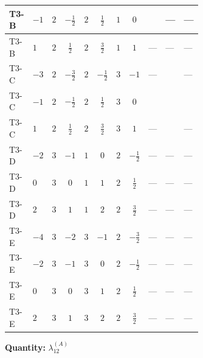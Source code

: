 \documentclass[8pt]{article}
\begin{document}
\begin{landscape}
\begin{longtable}{@{}llcccccc >{\raggedright\arraybackslash}p{0.21\linewidth} >{\raggedright\arraybackslash}p{0.21\linewidth} >{\raggedright\arraybackslash}p{0.21\linewidth}@{}}
\midrule
T3-B & $-1$ & $2$ & $-\frac{1}{2}$ & $2$ & $\frac{1}{2}$ & $1$ & $0$ & \scriptsize\adjustbox{max width=\linewidth}{$\begin{gathered} +{g_1}^2 \left(-6 {g_2}^2-3 {\lambda_{12}^{(A)}}\right)\end{gathered}$} & --- & --- \\
\midrule
T3-B & $1$ & $2$ & $\frac{1}{2}$ & $2$ & $\frac{3}{2}$ & $1$ & $1$ & --- & --- & --- \\
\midrule
T3-C & $-3$ & $2$ & $-\frac{3}{2}$ & $2$ & $-\frac{1}{2}$ & $3$ & $-1$ & --- & \scriptsize\adjustbox{max width=\linewidth}{$\begin{gathered} {\lambda_{12}^{(A)}} (3 T_{\nu}^{(1)}+3 T_{\nu}^{(2)})\end{gathered}$} & --- \\
\midrule
T3-C & $-1$ & $2$ & $-\frac{1}{2}$ & $2$ & $\frac{1}{2}$ & $3$ & $0$ & \scriptsize\adjustbox{max width=\linewidth}{$\begin{gathered} +{g_1}^2 \left(-6 {g_2}^2-3 {\lambda_{12}^{(A)}}\right)\end{gathered}$} & \scriptsize\adjustbox{max width=\linewidth}{$\begin{gathered} {\lambda_{12}^{(A)}} (3 T_{\nu}^{(1)}+3 T_{\nu}^{(2)})\end{gathered}$} & \scriptsize\adjustbox{max width=\linewidth}{$\begin{gathered} -\frac{8}{3} \operatorname{Tr}\!\left({y_1}\,\left({y_2}\right)^{\dagger}\,{y_2}\,\left({y_1}\right)^{\dagger}\right)\end{gathered}$} \\
\midrule
T3-C & $1$ & $2$ & $\frac{1}{2}$ & $2$ & $\frac{3}{2}$ & $3$ & $1$ & --- & \scriptsize\adjustbox{max width=\linewidth}{$\begin{gathered} {\lambda_{12}^{(A)}} (3 T_{\nu}^{(1)}+3 T_{\nu}^{(2)})\end{gathered}$} & --- \\
\midrule
T3-D & $-2$ & $3$ & $-1$ & $1$ & $0$ & $2$ & $-\frac{1}{2}$ & --- & --- & --- \\
\midrule
T3-D & $0$ & $3$ & $0$ & $1$ & $1$ & $2$ & $\frac{1}{2}$ & --- & --- & --- \\
\midrule
T3-D & $2$ & $3$ & $1$ & $1$ & $2$ & $2$ & $\frac{3}{2}$ & --- & --- & --- \\
\midrule
T3-E & $-4$ & $3$ & $-2$ & $3$ & $-1$ & $2$ & $-\frac{3}{2}$ & --- & --- & --- \\
\midrule
T3-E & $-2$ & $3$ & $-1$ & $3$ & $0$ & $2$ & $-\frac{1}{2}$ & --- & --- & --- \\
\midrule
T3-E & $0$ & $3$ & $0$ & $3$ & $1$ & $2$ & $\frac{1}{2}$ & --- & --- & --- \\
\midrule
T3-E & $2$ & $3$ & $1$ & $3$ & $2$ & $2$ & $\frac{3}{2}$ & --- & --- & --- \\
\midrule
\bottomrule
\end{longtable}
\clearpage
\noindent\textbf{Quantity: }$\lambda_{12}^{(A)}$\par\smallskip

\end{landscape}
\end{document}
